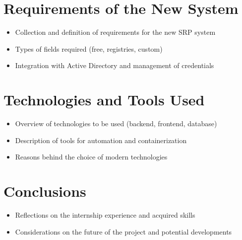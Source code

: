 \documentclass[a4paper, oneside, openright]{book}
\begin{document}
\tableofcontents  %
\newpage %
\setcounter{chapter}{-1} %
% 
% 






\chapter{Requirements of the New System}
\begin{itemize}
    \item Collection and definition of requirements for the new SRP system
    \item Types of fields required (free, registries, custom)
    \item Integration with Active Directory and management of credentials
\end{itemize}

\chapter{Technologies and Tools Used}
\begin{itemize}
    \item Overview of technologies to be used (backend, frontend, database)
    \item Description of tools for automation and containerization
    \item Reasons behind the choice of modern technologies
\end{itemize}

\chapter{Conclusions}
\begin{itemize}
    \item Reflections on the internship experience and acquired skills
    \item Considerations on the future of the project and potential developments
\end{itemize}

\backmatter
\sloppy %
\printbibliography[heading=bibintoc, title=Bibliography]

\end{document}
